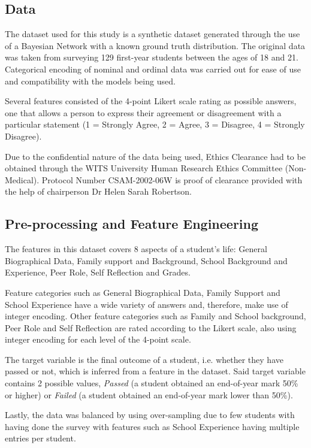 \documentclass[conference]{IEEEtran}
\begin{document}
\subsection{Data}
The dataset used for this study is a synthetic dataset generated through the use of a Bayesian Network with a known ground truth distribution. The original data was taken from surveying 129 first-year students between the ages of 18 and 21. Categorical encoding of nominal and ordinal data was carried out for ease of use and compatibility with the models being used.

Several features consisted of the 4-point Likert scale rating as possible answers, one that allows a person to express their agreement or disagreement with a particular statement (1 = Strongly Agree, 2 = Agree, 3 = Disagree, 4 = Strongly Disagree).

Due to the confidential nature of the data being used, Ethics Clearance had to be obtained through the WITS University Human Research Ethics Committee (Non-Medical). Protocol Number CSAM-2002-06W is proof of clearance provided with the help of chairperson Dr Helen Sarah Robertson.

\subsection{Pre-processing and Feature Engineering}
The features in this dataset covers 8 aspects of a student's life: General Biographical Data, Family support and Background, School Background and Experience, Peer Role, Self Reflection and Grades.

Feature categories such as General Biographical Data, Family Support and School Experience have a wide variety of answers and, therefore, make use of integer encoding. Other feature categories such as Family and School background, Peer Role and Self Reflection are rated according to the Likert scale, also using integer encoding for each level of the 4-point scale.

The target variable is the final outcome of a student, i.e. whether they have passed or not, which is inferred from a feature in the dataset. Said target variable contains 2 possible values, \textit{Passed} (a student obtained an end-of-year mark 50\% or higher) or \textit{Failed} (a student obtained an end-of-year mark lower than 50\%).

Lastly, the data was balanced by using over-sampling due to few students with having done the survey with features such as School Experience having multiple entries per student.
\end{document}
